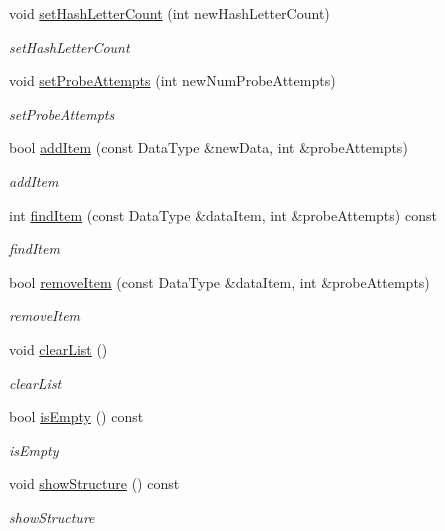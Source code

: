 \begin{DoxyCompactItemize}
void \hyperlink{class_hash_class_ae356a1dcd488abedb26b313390b69532}{set\+Hash\+Letter\+Count} (int new\+Hash\+Letter\+Count)
\begin{DoxyCompactList}\small\item\em set\+Hash\+Letter\+Count \end{DoxyCompactList}\item 
void \hyperlink{class_hash_class_a54ad53343edfb3db24daf6053c012598}{set\+Probe\+Attempts} (int new\+Num\+Probe\+Attempts)
\begin{DoxyCompactList}\small\item\em set\+Probe\+Attempts \end{DoxyCompactList}\item 
bool \hyperlink{class_hash_class_a6fb0fa005a8267034b4aeda0c734c993}{add\+Item} (const Data\+Type \&new\+Data, int \&probe\+Attempts)
\begin{DoxyCompactList}\small\item\em add\+Item \end{DoxyCompactList}\item 
int \hyperlink{class_hash_class_a2ebff4e648205c9b6f05e05ad80e346e}{find\+Item} (const Data\+Type \&data\+Item, int \&probe\+Attempts) const 
\begin{DoxyCompactList}\small\item\em find\+Item \end{DoxyCompactList}\item 
bool \hyperlink{class_hash_class_a9943daba32d6a7a653b4ce3a186efc4a}{remove\+Item} (const Data\+Type \&data\+Item, int \&probe\+Attempts)
\begin{DoxyCompactList}\small\item\em remove\+Item \end{DoxyCompactList}\item 
void \hyperlink{class_hash_class_ab523a6053adfdfeb99ec2a9521e6af39}{clear\+List} ()
\begin{DoxyCompactList}\small\item\em clear\+List \end{DoxyCompactList}\item 
bool \hyperlink{class_hash_class_aba14bac2806c2cd58595b6e34e4c015e}{is\+Empty} () const 
\begin{DoxyCompactList}\small\item\em is\+Empty \end{DoxyCompactList}\item 
void \hyperlink{class_hash_class_aca0bdfa67198e64503deccc71abb7c06}{show\+Structure} () const 
\begin{DoxyCompactList}\small\item\em show\+Structure \end{DoxyCompactList}\end{DoxyCompactItemize}
